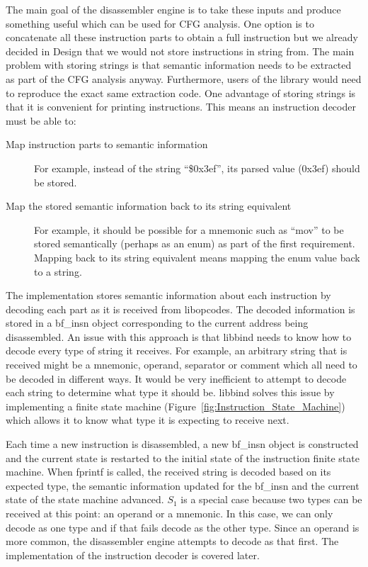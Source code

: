 The main goal of the disassembler engine is to take these inputs and produce something useful which can be used for CFG analysis. One option is to concatenate all these instruction parts to obtain a full instruction but we already decided in Design that we would not store instructions in string from. The main problem with storing strings is that semantic information needs to be extracted as part of the CFG analysis anyway. Furthermore, users of the library would need to reproduce the exact same extraction code. One advantage of storing strings is that it is convenient for printing instructions. This means an instruction decoder must be able to:

\begin{description}
\item [Map instruction parts to semantic information] For example, instead of the string \enquote{\$0x3ef}, its parsed value (0x3ef) should be stored.
\item [Map the stored semantic information back to its string equivalent] For example, it should be possible for a mnemonic such as \enquote{mov} to be stored semantically (perhaps as an enum) as part of the first requirement. Mapping back to its string equivalent means mapping the enum value back to a string.
\end{description}

The implementation stores semantic information about each instruction by decoding each part as it is received from libopcodes. The decoded information is stored in a bf\_insn object corresponding to the current address being disassembled. An issue with this approach is that libbind needs to know how to decode every type of string it receives. For example, an arbitrary string that is received might be a mnemonic, operand, separator or comment which all need to be decoded in different ways. It would be very inefficient to attempt to decode each string to determine what type it should be. libbind solves this issue by implementing a finite state machine (Figure~\ref{fig:Instruction_State_Machine}) which allows it to know what type it is expecting to receive next.

Each time a new instruction is disassembled, a new bf\_insn object is constructed and the current state is restarted to the initial state of the instruction finite state machine. When fprintf is called, the received string is decoded based on its expected type, the semantic information updated for the bf\_insn and the current state of the state machine advanced. $S_1$ is a special case because two types can be received at this point: an operand or a mnemonic. In this case, we can only decode as one type and if that fails decode as the other type. Since an operand is more common, the disassembler engine attempts to decode as that first. The implementation of the instruction decoder is covered later.

